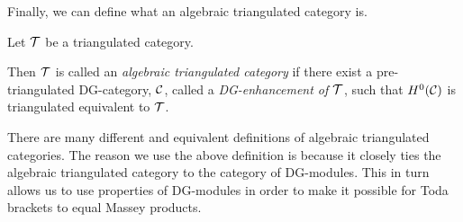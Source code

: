 Finally, we can define what an algebraic triangulated category is.
\begin{definition}
    \label{def:alg_tri_cat}
    Let \( {\mathcal{T}} \) be a triangulated category.

    Then \( {\mathcal{T}} \) is called an \emph{algebraic triangulated category} if there exist a pre-triangulated DG-category, \( {\mathcal{C}} \), called a \emph{DG-enhancement of \( {\mathcal{T}} \)}, such that \( H^0({\mathcal{C}}) \) is triangulated equivalent to \( {\mathcal{T}} \).
\end{definition}

There are many different and equivalent definitions of algebraic triangulated categories. The reason we use the above definition is because it closely ties the algebraic triangulated category to the category of DG-modules. This in turn allows us to use properties of DG-modules in order to make it possible for Toda brackets to equal Massey products.

